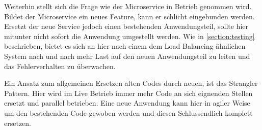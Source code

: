 Weiterhin stellt sich die Frage wie der Microservice in Betrieb genommen wird. Bildet der Microservice ein neues Feature, kann er schlicht eingebunden werden. Ersetzt der neue Service jedoch einen bestehenden Anwendungsteil, sollte hier mitunter nicht sofort die Anwendung umgestellt werden. Wie in \autoref{section:testing} beschrieben, bietet es sich an hier nach einem dem Load Balancing ähnlichen System nach und nach mehr Last auf den neuen Anwendungsteil zu leiten und das Fehlerverhalten zu überwachen.

Ein Ansatz zum allgemeinen Ersetzen alten Codes durch neuen, ist das Strangler Pattern\cite[][]{Fowler:Strangler}. Hier wird im Live Betrieb immer mehr Code an sich eignenden Stellen ersetzt und parallel betrieben. Eine neue Anwendung kann hier in agiler Weise um den bestehenden Code gewoben werden und diesen Schlussendlich komplett ersetzen.
